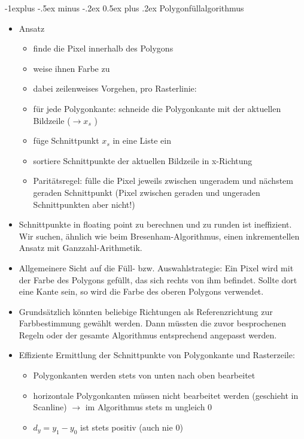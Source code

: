 \documentclass[10pt,landscape]{article}
\makeatletter
\renewcommand{\subsection}{\@startsection{subsection}{2}{0mm}%
                                {-1explus -.5ex minus -.2ex}%
                                {0.5ex plus .2ex}%
                                {\normalfont\normalsize\bfseries}}
\makeatother
\begin{document}
\begin{multicols}{3}
  
  \subsection{ Polygonfüllalgorithmus}
  \begin{itemize}
    \item Ansatz
          \begin{itemize}
            \item finde die Pixel innerhalb des Polygons
            \item weise ihnen Farbe zu
            \item dabei zeilenweises Vorgehen, pro Rasterlinie:
            \item für jede Polygonkante: schneide die Polygonkante mit der aktuellen Bildzeile ($\rightarrow x_s$ )
            \item füge Schnittpunkt $x_s$ in eine Liste ein
            \item sortiere Schnittpunkte der aktuellen Bildzeile in x-Richtung
            \item Paritätsregel: fülle die Pixel jeweils zwischen ungeradem und nächstem geraden Schnittpunkt (Pixel zwischen geraden und ungeraden Schnittpunkten aber nicht!)
          \end{itemize}
    \item Schnittpunkte in floating point zu berechnen und zu runden ist ineffizient. Wir suchen, ähnlich wie beim Bresenham-Algorithmus, einen inkrementellen Ansatz mit Ganzzahl-Arithmetik.
    \item Allgemeinere Sicht auf die Füll- bzw. Auswahlstrategie: Ein Pixel wird mit der Farbe des Polygons gefüllt, das sich rechts von ihm befindet. Sollte dort eine Kante sein, so wird die Farbe des oberen Polygons verwendet.
    \item Grundsätzlich könnten beliebige Richtungen als Referenzrichtung zur Farbbestimmung gewählt werden. Dann müssten die zuvor besprochenen Regeln oder der gesamte Algorithmus entsprechend angepasst werden.
    \item Effiziente Ermittlung der Schnittpunkte von Polygonkante und Rasterzeile:
          \begin{itemize}
            \item Polygonkanten werden stets von unten nach oben bearbeitet
            \item horizontale Polygonkanten müssen nicht bearbeitet werden (geschieht in Scanline) $\rightarrow$ im Algorithmus stets m ungleich 0
            \item $d_y = y_1 - y_0$ ist stets positiv (auch nie 0)

\end{itemize}
\end{itemize}
\end{multicols}
\end{document}
